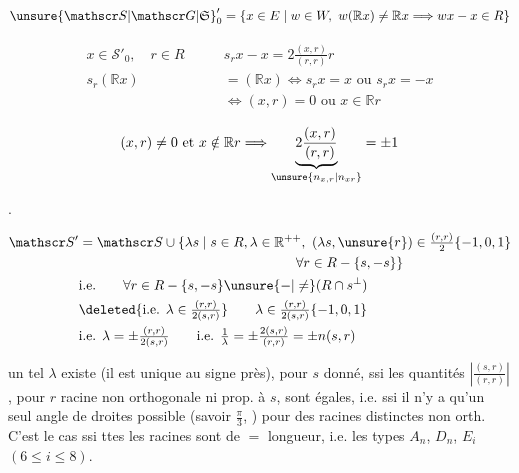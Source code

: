 
\[
\unsure{\mathscr S|\mathscr G|\mathfrak S}'_0=\{x\in E\mid w\in W,\ w(\mathbb R x)\ne\mathbb R x\Longrightarrow wx-x\in R\}
\]

\[
\begin{aligned}
x\in\mathscr S'_0,\quad r\in R\qquad&s_rx-x=2\frac{(x,r)}{(r,r)}r\\
s_r(\mathbb R x)&=(\mathbb R x)\Longleftrightarrow s_rx=x\text{ ou }s_rx=-x\\
&\Longleftrightarrow (x,r)=0\text{ ou }x\in\mathbb R r
\end{aligned}
\]

\[(x,r)\ne0\text{ et }x\notin\mathbb R r\Longrightarrow\underbrace{2\frac{(x,r)}{(r,r)}}_{\unsure{n_{x,r}|n_{x r}}}=\pm1\]

\quad .


\[
\begin{aligned}
\mathscr S'&=\mathscr S\cup\{\lambda s\mid s\in R,\lambda\in\mathbb R^{++},\
 (\lambda s,\unsure{r})\in\tfrac{(r,r)}2\{-1,0,1\}\\
&\hspace{16em}\forall r\in R-\{s,-s\}\}\\
&\text{i.e.}\qquad \forall r\in R-\{s,-s\}\unsure{-|\ne}(R\cap s^\perp)\\
&\deleted{\text{i.e. }\lambda\in\tfrac{(r,r)}{2(s,r)}}\qquad
 \lambda\in\tfrac{(r,r)}{2(s,r)}\{-1,0,1\}\\
&\text{i.e. }\lambda=\pm\tfrac{(r,r)}{2(s,r)}\qquad
 \text{i.e. }\tfrac1\lambda=\pm\tfrac{2(s,r)}{(r,r)}=\pm n(s,r)
\end{aligned}
\]

un tel $\lambda$ existe (il est unique au signe près), pour $s$ donné, ssi les quantités $\left|\frac{(s,r)}{(r,r)}\right|$, pour $r$ racine non orthogonale ni prop. à $s$, sont égales, i.e. ssi il n’y a qu’un seul angle de droites possible (savoir $\frac\pi3$, ) pour des racines distinctes non orth. C’est le cas ssi ttes les racines sont de $=$ longueur, i.e. les types $A_n$, $D_n$, $E_i$ $(6\leq i\leq8)$.

